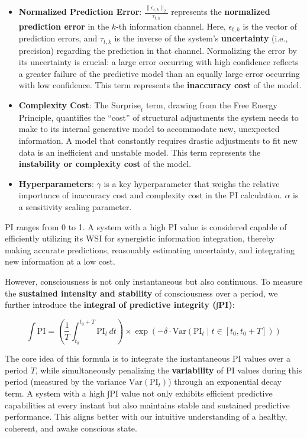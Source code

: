 \documentclass[
  a4paper]{article}
\providecommand{\tightlist}{%
  \setlength{\itemsep}{0pt}\setlength{\parskip}{0pt}}
\begin{document}
\begin{itemize}
\tightlist
\item
  \textbf{Normalized Prediction Error}:
  \(\frac{\|\epsilon_{t,k}\|_2}{\tau_{t,k}}\) represents the
  \textbf{normalized prediction error} in the \(k\)-th information
  channel. Here, \(\epsilon_{t,k}\) is the vector of prediction errors,
  and \(\tau_{t,k}\) is the inverse of the system's \textbf{uncertainty}
  (i.e., precision) regarding the prediction in that channel.
  Normalizing the error by its uncertainty is crucial: a large error
  occurring with high confidence reflects a greater failure of the
  predictive model than an equally large error occurring with low
  confidence. This term represents the \textbf{inaccuracy cost} of the
  model.
\item
  \textbf{Complexity Cost}: The \(\text{Surprise}_{t}\) term, drawing
  from the Free Energy Principle, quantifies the ``cost'' of structural
  adjustments the system needs to make to its internal generative model
  to accommodate new, unexpected information. A model that constantly
  requires drastic adjustments to fit new data is an inefficient and
  unstable model. This term represents the \textbf{instability or
  complexity cost} of the model.
\item
  \textbf{Hyperparameters}: \(\gamma\) is a key hyperparameter that
  weighs the relative importance of inaccuracy cost and complexity cost
  in the PI calculation. \(\alpha\) is a sensitivity scaling parameter.
\end{itemize}

PI ranges from 0 to 1. A system with a high PI value is considered
capable of efficiently utilizing its WSI for synergistic information
integration, thereby making accurate predictions, reasonably estimating
uncertainty, and integrating new information at a low cost.

However, consciousness is not only instantaneous but also continuous. To
measure the \textbf{sustained intensity and stability} of consciousness
over a period, we further introduce the \textbf{integral of predictive
integrity (∫PI)}:

\[
\int \mathrm{PI} = \left( \frac{1}{T} \int_{t_0}^{t_0+T} \mathrm{PI}_t \, dt \right) \times \exp\left(-\delta \cdot \text{Var}(\mathrm{PI}_t \mid t \in [t_0, t_0+T])\right)
\]

The core idea of this formula is to integrate the instantaneous PI
values over a period \(T\), while simultaneously penalizing the
\textbf{variability} of PI values during this period (measured by the
variance \(\text{Var}(\text{PI}_t)\)) through an exponential decay term.
A system with a high ∫PI value not only exhibits efficient predictive
capabilities at every instant but also maintains stable and sustained
predictive performance. This aligns better with our intuitive
understanding of a healthy, coherent, and awake conscious state.
\end{document}
